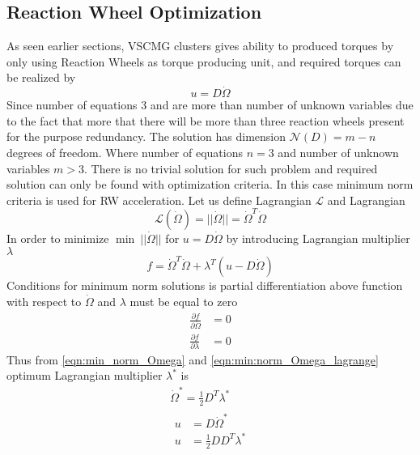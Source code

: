 \subsection{Reaction Wheel Optimization}
As seen earlier sections, VSCMG clusters gives ability to produced torques by only using Reaction Wheels as torque producing unit, and required torques can be realized by
\begin{equation}
u=D\dot{\Omega }
\end{equation}
Since number of equations 3 and are more than number of unknown variables due to the fact that more that there will be more than three reaction wheels present for the purpose redundancy. The solution has dimension $\displaystyle \mathcal{N}( D) =m-n$ degrees of freedom. Where number of equations $\displaystyle n=3$ and number of unknown variables $\displaystyle m >3$. There is no trivial solution for such problem and required solution can only be found with optimization criteria. In this case minimum norm criteria is used for RW acceleration. Let us define Lagrangian $\displaystyle \mathcal{L}$ and Lagrangian 
\begin{equation}
\mathcal{L}(\dot{\Omega }) =||\dot{\Omega } ||=\dot{\Omega }^{T}\dot{\Omega }
\end{equation}
In order to minimize $\displaystyle \min \ ||\dot{\Omega } ||$ for $\displaystyle u=D\dot{\Omega }$ by introducing Lagrangian multiplier $\displaystyle \lambda $
\begin{equation}
f=\dot{\Omega }^{T}\dot{\Omega } +\lambda ^{T}( u-D\dot{\Omega })
\label{eqn:min_norm_Omega}
\end{equation}
Conditions for minimum norm solutions is partial differentiation above function with respect to $\displaystyle \dot{\Omega }$ and $\displaystyle \lambda $ must be equal to zero
\begin{equation}
\begin{aligned}
\frac{\partial f}{\partial \dot{\Omega }} & =0\\
\frac{\partial f}{\partial \lambda } & =0
\end{aligned}
\label{eqn:min:norm_Omega_lagrange}
\end{equation}
Thus from \autoref{eqn:min_norm_Omega} and \autoref{eqn:min:norm_Omega_lagrange} optimum Lagrangian multiplier $\displaystyle \lambda ^{*}$ is
\begin{gather}
\dot{\Omega }^{*} =\frac{1}{2} D^{T} \lambda ^{*}\\
\begin{aligned}
u & =D\dot{\Omega }^{*}\\
u & =\frac{1}{2} DD^{T} \lambda ^{*}
\end{aligned}
\end{gather}
